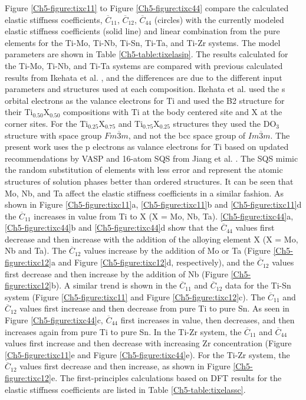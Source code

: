 Figure \ref{Ch5-figure:tixc11} to Figure \ref{Ch5-figure:tixc44} compare the calculated elastic stiffness coefficients, $\overline{C}_{11}$, $\overline{C}_{12}$, $\overline{C}_{44}$ (circles) with the currently modeled elastic stiffness coefficients (solid line) and linear combination from the pure elements for the Ti-Mo, Ti-Nb, Ti-Sn, Ti-Ta, and Ti-Zr systems. The model parameters are shown in Table \ref{Ch5-table:tixelasip}. The results calculated for the Ti-Mo, Ti-Nb, and Ti-Ta systems are compared with previous calculated results from Ikehata et al. \cite{Ikehata2004}, and the differences are due to the different input parameters and structures used at each composition. Ikehata et al. \cite{Ikehata2004} used the s orbital electrons as the valance electrons for Ti and used the B2 structure for their Ti$_{0.50}$X$_{0.50}$ compositions with Ti at the body centered site and X at the corner sites. For the Ti$_{0.25}$X$_{0.75}$ and Ti$_{0.75}$X$_{0.25}$ structures they used the DO$_{3}$ structure with space group $Fm\overline{3}m$, and not the bcc space group of $Im\overline{3}m$. The present work uses the p electrons as valance electrons for Ti based on updated recommendations by VASP and 16-atom SQS from Jiang et al. \cite{Jiang2004}. The SQS mimic the random substitution of elements with less error and represent the atomic structures of solution phases better than ordered structures. It can be seen that Mo, Nb, and Ta affect the elastic stiffness coefficients in a similar fashion. As shown in Figure \ref{Ch5-figure:tixc11}a, \ref{Ch5-figure:tixc11}b and \ref{Ch5-figure:tixc11}d the $\overline{C}_{11}$ increases in value from Ti to X (X = Mo, Nb, Ta). \ref{Ch5-figure:tixc44}a, \ref{Ch5-figure:tixc44}b and \ref{Ch5-figure:tixc44}d show that the $\overline{C}_{44}$ values first decrease and then increase with the addition of the alloying element X (X = Mo, Nb and Ta). The $\overline{C}_{12}$ values increase by the addition of Mo or Ta (Figure \ref{Ch5-figure:tixc12}a and Figure \ref{Ch5-figure:tixc12}d, respectively), and the $\overline{C}_{12}$ values first decrease and then increase by the addition of Nb (Figure \ref{Ch5-figure:tixc12}b). A similar trend is shown in the $\overline{C}_{11}$ and $\overline{C}_{12}$ data for the Ti-Sn system (Figure \ref{Ch5-figure:tixc11} and Figure \ref{Ch5-figure:tixc12}c). The $\overline{C}_{11}$ and $\overline{C}_{12}$ values first increase and then decrease from pure Ti to pure Sn. As seen in Figure \ref{Ch5-figure:tixc44}c, $\overline{C}_{44}$ first increases in value, then decreases, and then increases again from pure Ti to pure Sn. In the Ti-Zr system, the $\overline{C}_{11}$ and $\overline{C}_{44}$ values first increase and then decrease with increasing Zr concentration (Figure \ref{Ch5-figure:tixc11}e and Figure \ref{Ch5-figure:tixc44}e). For the Ti-Zr system, the $\overline{C}_{12}$ values first decrease and then increase, as shown in Figure \ref{Ch5-figure:tixc12}e. The first-principles calculations based on DFT results for the elastic stiffness coefficients are listed in Table \ref{Ch5-table:tixelassc}.

